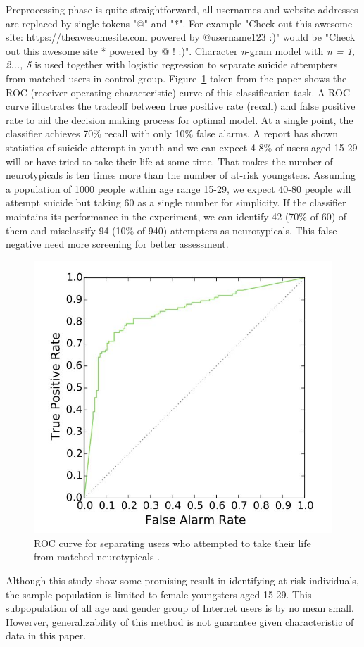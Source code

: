 Preprocessing phase is quite straightforward, all usernames and website addresses are replaced by single tokens "@" and "*". For example "Check out this awesome site: https://theawesomesite.com powered by @username123 :)" would be "Check out this awesome site * powered by @ ! :)". Character \textit{n}-gram model with \textit{n = 1, 2..., 5} is used together with logistic regression to separate suicide attempters from matched users in control group. Figure~\ref{fig:roc_curve} taken from the paper \cite{Coppersmith2016} shows the ROC (receiver operating characteristic) curve of this classification task. A ROC curve illustrates the tradeoff between true positive rate (recall) and false positive rate to aid the decision making process for optimal model. At a single point, the classifier achieves 70\% recall with only 10\% false alarms. A report \cite{Kann2016} has shown statistics of suicide attempt in youth and we can expect 4-8\% of users aged 15-29 will or have tried to take their life at some time. That makes the number of neurotypicals is ten times more than the number of at-risk youngsters. Assuming a population of 1000 people within age range 15-29, we expect 40-80 people will attempt suicide but taking 60 as a single number for simplicity. If the classifier maintains its performance in the experiment, we can identify 42 (70\% of 60) of them and misclassify 94 (10\% of 940) attempters as neurotypicals. This false negative need more screening for better assessment.
\begin{figure}
\centering
\includegraphics[width=\textwidth, clip=true]{img/ROC_curve}
\caption{ROC curve for separating users who attempted to take their life from matched neurotypicals \cite{Coppersmith2016}.} 
\label{fig:roc_curve}
\end{figure}
Although this study show some promising result in identifying at-risk individuals, the sample population is limited to female youngsters aged 15-29. This subpopulation of all age and gender group of Internet users is by no mean small. Howerver, generalizability of this method is not guarantee given characteristic of data in this paper.\\
